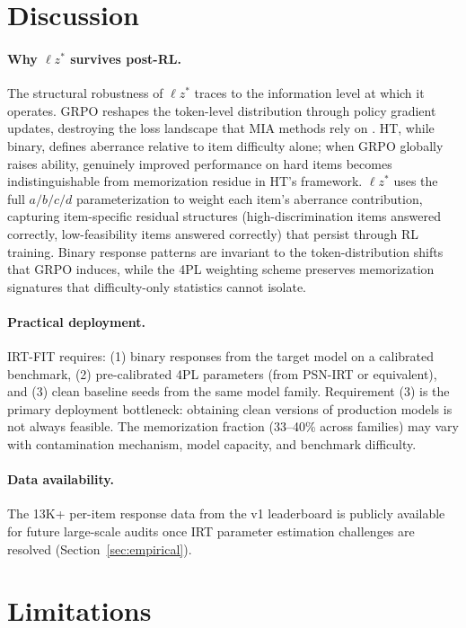 \documentclass[11pt,a4paper]{article}
\newcommand{\lzstar}{$\ell z^*$}
\begin{document}
\section{Discussion}

\paragraph{Why \lzstar{} survives post-RL.} The structural robustness of \lzstar{} traces to the information level at which it operates. GRPO reshapes the token-level distribution through policy gradient updates, destroying the loss landscape that MIA methods rely on \citep{wang2025postrl}. HT, while binary, defines aberrance relative to item difficulty alone; when GRPO globally raises ability, genuinely improved performance on hard items becomes indistinguishable from memorization residue in HT's framework. \lzstar{} uses the full $a/b/c/d$ parameterization to weight each item's aberrance contribution, capturing item-specific residual structures (high-discrimination items answered correctly, low-feasibility items answered correctly) that persist through RL training. Binary response patterns are invariant to the token-distribution shifts that GRPO induces, while the 4PL weighting scheme preserves memorization signatures that difficulty-only statistics cannot isolate.

\paragraph{Practical deployment.} IRT-FIT requires: (1) binary responses from the target model on a calibrated benchmark, (2) pre-calibrated 4PL parameters (from PSN-IRT or equivalent), and (3) clean baseline seeds from the same model family. Requirement (3) is the primary deployment bottleneck: obtaining clean versions of production models is not always feasible. The memorization fraction (33--40\% across families) may vary with contamination mechanism, model capacity, and benchmark difficulty.

\paragraph{Data availability.} The 13K+ per-item response data from the v1 leaderboard is publicly available for future large-scale audits once IRT parameter estimation challenges are resolved (Section~\ref{sec:empirical}).

\section{Limitations}
\end{document}
